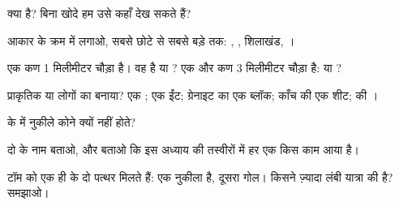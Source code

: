 \begin{exercise}[$\star$]\label{exo:g3:stones-pebbles-sand:1}
 क्या है? बिना खोदे हम उसे कहाँ देख सकते हैं?
\end{exercise}

\begin{exercise}[$\star$]\label{exo:g3:stones-pebbles-sand:2}
आकार के क्रम में लगाओ, सबसे छोटे से सबसे बड़े तक: , , शिलाखंड,
।
\end{exercise}

\begin{exercise}[$\star$]\label{exo:g3:stones-pebbles-sand:3}
एक कण 1 मिलीमीटर चौड़ा है। वह  है या ? एक और कण 3 मिलीमीटर चौड़ा
है:  या ?
\end{exercise}

\begin{exercise}[$\star$]\label{exo:g3:stones-pebbles-sand:4}
प्राकृतिक या लोगों का बनाया? एक ; एक ईंट; ग्रेनाइट का एक ब्लॉक; काँच
की एक शीट;   की ।
\end{exercise}

\begin{exercise}[$\star$]\label{exo:g3:stones-pebbles-sand:5}
 के  में नुकीले कोने क्यों नहीं होते?
\end{exercise}

\begin{exercise}[$\star$]\label{exo:g3:stones-pebbles-sand:6}
दो  के नाम बताओ, और बताओ कि इस अध्याय की तस्वीरों में हर एक
किस काम आया है।
\end{exercise}

\begin{exercise}[$\star\star$]\label{exo:g3:stones-pebbles-sand:7}
टॉम को एक ही  के दो पत्थर मिलते हैं: एक नुकीला है, दूसरा गोल। किसने
ज़्यादा लंबी यात्रा की है? समझाओ।
\end{exercise}

